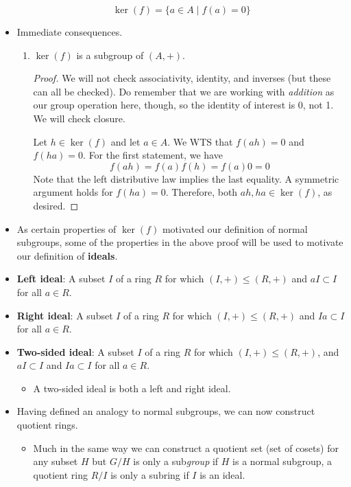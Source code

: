 \documentclass[../notes.tex]{subfiles}
\begin{document}
\begin{itemize}
    \begin{equation*}
        \ker(f) = \{a\in A\mid f(a)=0\}
    \end{equation*}
    \item Immediate consequences.
    \begin{enumerate}[label={(\roman*)}]
        \item $\ker(f)$ is a subgroup of $(A,+)$.
        \begin{proof}
            We will not check associativity, identity, and inverses (but these can all be checked). Do remember that we are working with \emph{addition} as our group operation here, though, so the identity of interest is 0, not 1. We will check closure.\par
            Let $h\in\ker(f)$ and let $a\in A$. We WTS that $f(ah)=0$ and $f(ha)=0$. For the first statement, we have
            \begin{equation*}
                f(ah) = f(a)f(h)
                = f(a)0
                = 0
            \end{equation*}
            Note that the left distributive law implies the last equality. A symmetric argument holds for $f(ha)=0$. Therefore, both $ah,ha\in\ker(f)$, as desired.
        \end{proof}
    \end{enumerate}
    \item As certain properties of $\ker(f)$ motivated our definition of normal subgroups, some of the properties in the above proof will be used to motivate our definition of \textbf{ideals}.
    \item \textbf{Left ideal}: A subset $I$ of a ring $R$ for which $(I,+)\leq(R,+)$ and $aI\subset I$ for all $a\in R$.
    \item \textbf{Right ideal}: A subset $I$ of a ring $R$ for which $(I,+)\leq(R,+)$ and $Ia\subset I$ for all $a\in R$.
    \item \textbf{Two-sided ideal}: A subset $I$ of a ring $R$ for which $(I,+)\leq(R,+)$, and $aI\subset I$ and $Ia\subset I$ for all $a\in R$.
    \begin{itemize}
        \item A two-sided ideal is both a left and right ideal.
    \end{itemize}
    \item Having defined an analogy to normal subgroups, we can now construct quotient rings.
    \begin{itemize}
        \item Much in the same way we can construct a quotient set (set of cosets) for any subset $H$ but $G/H$ is only a sub\emph{group} if $H$ is a normal subgroup, a quotient ring $R/I$ is only a subring if $I$ is an ideal.

\end{itemize}
\end{itemize}
\end{document}
